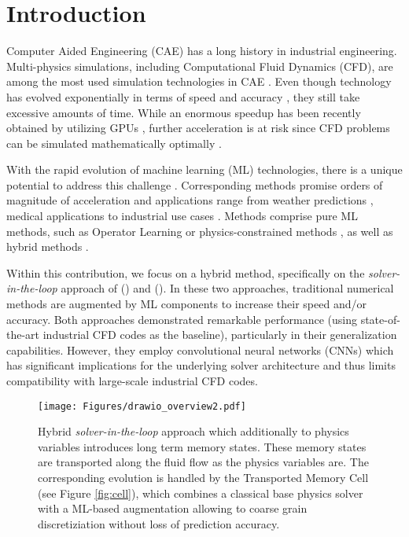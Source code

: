 \section{Introduction}

Computer Aided Engineering (CAE) has a long history in industrial engineering. Multi-physics simulations, including Computational Fluid Dynamics (CFD), are among the most used simulation technologies in CAE \cite{liu2022eighty,Kelsall2022CFD}. Even though technology has evolved exponentially in terms of speed and accuracy \cite{ruede2018research}, they still take excessive amounts of time. While an enormous speedup has been recently obtained by utilizing GPUs \cite{gavranovic2024fastsolvers}, further acceleration is at risk since CFD problems can be simulated mathematically optimally \cite{becker2001optimal,Hackbusch2013multi}. 

With the rapid evolution of machine learning (ML) technologies, there is a unique potential to address this challenge \cite{karniadakis2021physics, weinan2021dawning}. Corresponding methods promise orders of magnitude of acceleration \cite{hutson2020ai} and applications range from weather predictions \cite{lam2023learning}, medical applications \cite{karniadakis2021physics} to industrial use cases \cite{lavin2021simulation}. Methods comprise pure ML methods, such as Operator Learning \cite{kovachki2021neural} or physics-constrained methods \cite{karniadakis2021physics}, as well as hybrid methods \cite{sanderse2024scientific}.

Within this contribution, we focus on a hybrid method, specifically on the \textit{solver-in-the-loop} approach of \citeauthor{um2020solver} (\citeyear{um2020solver}) and \citeauthor{kochkov2021machine}(\citeyear{kochkov2021machine}). In these two approaches, traditional numerical methods are augmented by ML components to increase their speed and/or accuracy. Both approaches demonstrated remarkable performance (using state-of-the-art industrial CFD codes as the baseline), particularly in their generalization capabilities. However, they employ convolutional neural networks (CNNs) which has significant implications for the underlying solver architecture and thus limits compatibility with large-scale industrial CFD codes.

\begin{figure}[H]
    \centering
    \texttt{[image: Figures/drawio\_overview2.pdf]}
    \caption{Hybrid \textit{solver-in-the-loop} approach which additionally to physics variables introduces long term memory states. These memory states are transported along the fluid flow as the physics variables are. The corresponding evolution is handled by the Transported Memory Cell (see Figure \ref{fig:cell}), which combines a classical base physics solver with a ML-based augmentation allowing to coarse grain discretiziation without loss of prediction accuracy. }
    \label{fig:overview}
\end{figure}

